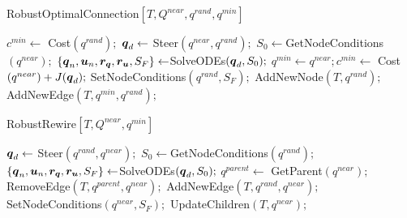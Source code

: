 \begin{algorithm}[htp]
    \caption{RobustOptimalConnection$[T, Q^{near}, q^{rand}, q^{min}]$}\label{alg:RobustOptimalConnect}
    \begin{algorithmic}[1]
        \State $c^{min} \gets$ Cost$(q^{rand});$
            \State $\boldsymbol{q}_d \gets$ Steer$(q^{near},q^{rand});$
            \State $S_0 \gets $GetNodeConditions$({q^{near}});$
            \State $\left \{\boldsymbol{q}_n, \boldsymbol{u}_n, \boldsymbol{r_q}, \boldsymbol{r_u}, S_F \right \}  \gets $SolveODEs$(\boldsymbol{q}_d, S_0);$
                    \State $q^{min} \gets q^{near}; c^{min} \gets$ Cost$(q^{near}) + J(\boldsymbol{q}_d);$
                    \State SetNodeConditions$({q^{rand}}, S_{F});$
                \EndIf
            \EndIf
        \EndFor
        \State AddNewNode$(T, {q^{rand}});$
        \State AddNewEdge$(T, {q^{min}}, {q^{rand}});$
    \end{algorithmic}
\end{algorithm}

\begin{algorithm}[htp]
    \caption{RobustRewire$[T, Q^{near}, q^{min}]$}\label{alg:RobustRewire}
    \begin{algorithmic}[1]
            \State $\boldsymbol{q}_d \gets$ Steer$(q^{rand}, q^{near});$
            \State $S_0 \gets $GetNodeConditions$({q^{rand}});$
            \State $\left \{\boldsymbol{q}_n, \boldsymbol{u}_n, \boldsymbol{r_q}, \boldsymbol{r_u}, S_F \right \}  \gets $SolveODEs$(\boldsymbol{q}_d, S_0);$
                    \State $q^{parent} \gets$ GetParent$(q^{near});$
                    \State RemoveEdge$(T, q^{parent}, q^{near});$
                    \State AddNewEdge$(T, q^{rand}, q^{near});$
                    \State SetNodeConditions$(q^{near}, S_{F});$
                    \State UpdateChildren$(T, q^{near});$
                \EndIf
            \EndIf
        \EndFor
    \end{algorithmic}
\end{algorithm}


